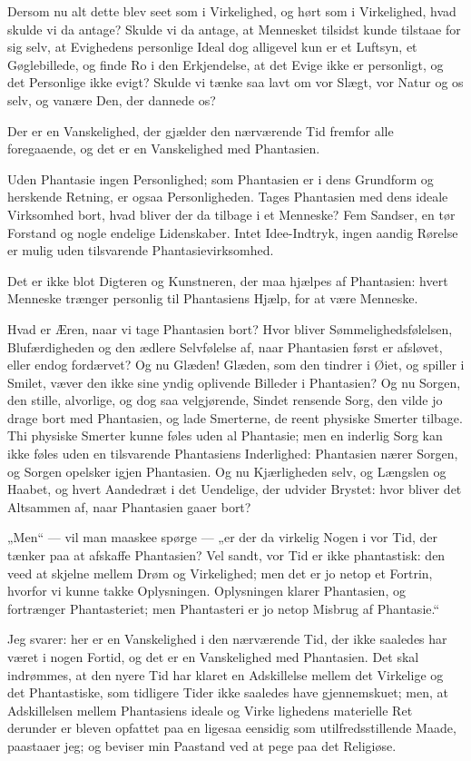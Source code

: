 \documentclass[12pt,a4paper]{book}
\newcommand{\apage}[1]{\marginnote{\footnotesize\textit{[#1]}}}
\begin{document}
Dersom nu alt dette blev seet som i Virkelighed, og hørt som i Virkelighed, hvad skulde vi da antage? Skulde vi da antage, at Mennesket tilsidst kunde tilstaae for sig selv, at Evighedens personlige Ideal dog alligevel kun er et Luftsyn, et Gøglebillede, og finde Ro i den Erkjendelse, at det Evige ikke er personligt, og det Personlige ikke evigt? Skulde vi tænke saa lavt om vor Slægt, vor Natur og os selv, og vanære Den, der dannede os?

Der er en Vanskelighed, der gjælder den nærværende Tid fremfor alle foregaaende, og det er en Vanskelighed med Phantasien.

Uden Phantasie ingen Personlighed; som Phantasien er i dens Grundform og herskende Retning, er ogsaa Personligheden. Tages Phantasien med dens ideale Virksomhed bort, hvad bliver der da tilbage i et Menneske? Fem Sandser, en
tør Forstand og nogle endelige Lidenskaber. Intet Idee-Indtryk, ingen aandig Rørelse er mulig uden tilsvarende Phantasievirksomhed.

Det er ikke blot Digteren og Kunstneren, der maa \apage{9} hjælpes af Phantasien: hvert Menneske trænger personlig til Phantasiens Hjælp, for at være Menneske.

Hvad er Æren, naar vi tage Phantasien bort? Hvor bliver Sømmelighedsfølelsen, Blufærdigheden og den ædlere Selvfølelse af, naar Phantasien først er afsløvet, eller endog fordærvet? Og nu Glæden! Glæden, som den tindrer i Øiet, og spiller i Smilet, væver den ikke sine yndig oplivende Billeder i Phantasien? Og nu Sorgen, den stille, alvorlige, og dog saa velgjørende, Sindet rensende Sorg, den vilde jo drage bort med Phantasien, og lade Smerterne, de reent physiske Smerter tilbage. Thi physiske Smerter kunne føles uden al Phantasie; men en inderlig Sorg kan ikke føles uden en tilsvarende Phantasiens Inderlighed: Phantasien nærer Sorgen, og Sorgen opelsker igjen Phantasien. Og nu Kjærligheden selv, og Længslen og Haabet, og hvert Aandedræt i det Uendelige, der udvider Brystet: hvor bliver det Altsammen af, naar Phantasien gaaer bort?

„Men“ --- vil man maaskee spørge --- „er der da virkelig Nogen i vor Tid, der tænker paa at afskaffe Phantasien? Vel sandt, vor Tid er ikke phantastisk: den veed at skjelne mellem Drøm og Virkelighed; men det er jo netop et Fortrin, hvorfor vi kunne takke Oplysningen. Oplysningen klarer Phantasien, og fortrænger Phantasteriet; men Phantasteri er jo netop Misbrug af Phantasie.“

Jeg svarer: her er en Vanskelighed i den nærværende Tid, der ikke saaledes har været i nogen Fortid, og det er en Vanskelighed med Phantasien. Det skal indrømmes, at den nyere Tid har klaret en Adskillelse mellem det Virkelige og det Phantastiske, som tidligere Tider ikke saaledes have gjennemskuet; men, at Adskillelsen mellem Phantasiens ideale og Virke\-%
lighedens materielle Ret derunder er bleven opfattet \apage{10} paa en ligesaa eensidig som utilfredsstillende Maade, paastaaer jeg; og beviser min Paastand ved at pege paa det Religiøse.
\end{document}

